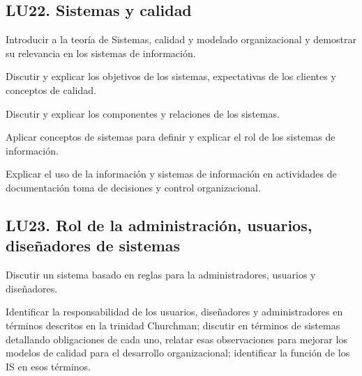 \subsection{LU22. Sistemas y calidad}\label{sec:BOK-LU22}\label{sec:LU22}
\begin{LearningUnit}
\begin{LUGoal}
\item Introducir a la teoría de Sistemas, calidad  y modelado organizacional y demostrar su relevancia en los sistemas de información.
\end{LUGoal}

\begin{LUObjective}
\item Discutir y explicar los objetivos de los sistemas, expectativas de los clientes y conceptos de calidad.
\item Discutir y explicar los componentes y relaciones de los sistemas.
\item Aplicar conceptos de sistemas para definir y explicar el rol de los sistemas de información.
\item Explicar el uso de la información y sistemas de información en actividades de documentación toma de decisiones y control organizacional.
\end{LUObjective}
\end{LearningUnit}

\subsection{LU23. Rol de la administración, usuarios, diseñadores de sistemas}\label{sec:BOK-LU23}\label{sec:LU23}
\begin{LearningUnit}
\begin{LUGoal}
\item Discutir un sistema basado en reglas para la administradores, usuarios y diseñadores.
\end{LUGoal}

\begin{LUObjective}
\item Identificar la responsabilidad de los usuarios, diseñadores y administradores en términos descritos en la trinidad Churchman;  discutir en términos de sistemas detallando obligaciones de cada uno, relatar esas observaciones para mejorar los modelos de calidad para el desarrollo organizacional; identificar la función de los  IS en esos términos.
\end{LUObjective}
\end{LearningUnit}

